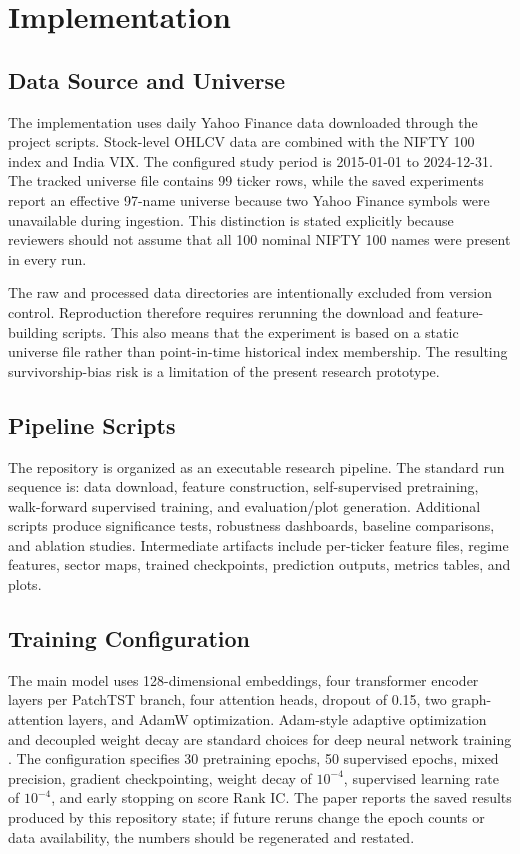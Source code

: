 \documentclass[conference]{IEEEtran}
\begin{document}
\section{Implementation}
\subsection{Data Source and Universe}
The implementation uses daily Yahoo Finance data downloaded through the project scripts. Stock-level OHLCV data are combined with the NIFTY 100 index and India VIX. The configured study period is 2015-01-01 to 2024-12-31. The tracked universe file contains 99 ticker rows, while the saved experiments report an effective 97-name universe because two Yahoo Finance symbols were unavailable during ingestion. This distinction is stated explicitly because reviewers should not assume that all 100 nominal NIFTY 100 names were present in every run.

The raw and processed data directories are intentionally excluded from version control. Reproduction therefore requires rerunning the download and feature-building scripts. This also means that the experiment is based on a static universe file rather than point-in-time historical index membership. The resulting survivorship-bias risk is a limitation of the present research prototype.

\subsection{Pipeline Scripts}
The repository is organized as an executable research pipeline. The standard run sequence is: data download, feature construction, self-supervised pretraining, walk-forward supervised training, and evaluation/plot generation. Additional scripts produce significance tests, robustness dashboards, baseline comparisons, and ablation studies. Intermediate artifacts include per-ticker feature files, regime features, sector maps, trained checkpoints, prediction outputs, metrics tables, and plots.

\subsection{Training Configuration}
The main model uses 128-dimensional embeddings, four transformer encoder layers per PatchTST branch, four attention heads, dropout of 0.15, two graph-attention layers, and AdamW optimization. Adam-style adaptive optimization and decoupled weight decay are standard choices for deep neural network training \cite{kingma2015adam,loshchilov2019decoupled}. The configuration specifies 30 pretraining epochs, 50 supervised epochs, mixed precision, gradient checkpointing, weight decay of $10^{-4}$, supervised learning rate of $10^{-4}$, and early stopping on score Rank IC. The paper reports the saved results produced by this repository state; if future reruns change the epoch counts or data availability, the numbers should be regenerated and restated.
\end{document}
